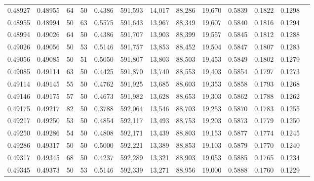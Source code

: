 \begin{tabular}{rrrrrrrrrrrrr}
0.48927 & 0.48955 &    64 &  50 &                                     0.4386 & 591,593 &  14,017 &  88,286 &  19,670 & 0.5839 & 0.1822 & 0.1298 \\
0.48955 & 0.48994 &    50 &  63 &                                     0.5575 & 591,643 &  13,967 &  88,349 &  19,607 & 0.5840 & 0.1816 & 0.1294 \\
0.48994 & 0.49026 &    64 &  50 &                                     0.4386 & 591,707 &  13,903 &  88,399 &  19,557 & 0.5845 & 0.1812 & 0.1288 \\
0.49026 & 0.49056 &    50 &  53 &                                     0.5146 & 591,757 &  13,853 &  88,452 &  19,504 & 0.5847 & 0.1807 & 0.1283 \\
0.49056 & 0.49085 &    50 &  51 &                                     0.5050 & 591,807 &  13,803 &  88,503 &  19,453 & 0.5849 & 0.1802 & 0.1279 \\
0.49085 & 0.49114 &    63 &  50 &                                     0.4425 & 591,870 &  13,740 &  88,553 &  19,403 & 0.5854 & 0.1797 & 0.1273 \\
0.49114 & 0.49145 &    55 &  50 &                                     0.4762 & 591,925 &  13,685 &  88,603 &  19,353 & 0.5858 & 0.1793 & 0.1268 \\
0.49146 & 0.49175 &    57 &  50 &                                     0.4673 & 591,982 &  13,628 &  88,653 &  19,303 & 0.5862 & 0.1788 & 0.1262 \\
0.49175 & 0.49217 &    82 &  50 &                                     0.3788 & 592,064 &  13,546 &  88,703 &  19,253 & 0.5870 & 0.1783 & 0.1255 \\
0.49217 & 0.49250 &    53 &  50 &                                     0.4854 & 592,117 &  13,493 &  88,753 &  19,203 & 0.5873 & 0.1779 & 0.1250 \\
0.49250 & 0.49286 &    54 &  50 &                                     0.4808 & 592,171 &  13,439 &  88,803 &  19,153 & 0.5877 & 0.1774 & 0.1245 \\
0.49286 & 0.49317 &    50 &  50 &                                     0.5000 & 592,221 &  13,389 &  88,853 &  19,103 & 0.5879 & 0.1770 & 0.1240 \\
0.49317 & 0.49345 &    68 &  50 &                                     0.4237 & 592,289 &  13,321 &  88,903 &  19,053 & 0.5885 & 0.1765 & 0.1234 \\
0.49345 & 0.49373 &    50 &  53 &                                     0.5146 & 592,339 &  13,271 &  88,956 &  19,000 & 0.5888 & 0.1760 & 0.1229 \\

\end{tabular}
